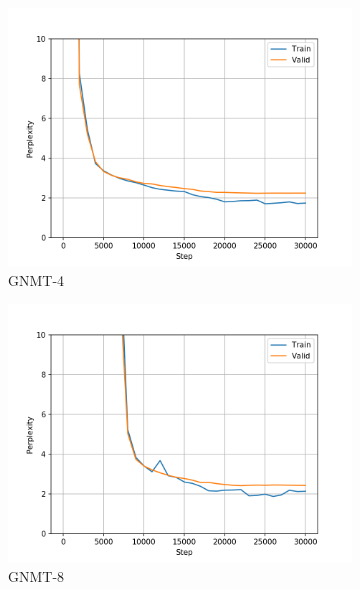 \begin{figure}[h]
\begin{subfigure}{0.3\textwidth}
\includegraphics[width=\textwidth]{../results/dbnqa1/run1/wmt16_gnmt_4_layer/ppls.png} 
\caption{GNMT-4}
\label{fig:dbnqa gnmt4 ppl}
\end{subfigure}
\hfill
\begin{subfigure}{0.3\textwidth}
\includegraphics[width=\textwidth]{../results/dbnqa1/run1/wmt16_gnmt_8_layer/ppls.png}
\caption{GNMT-8}
\label{fig:dbnqa gnmt8 ppl}
\end{subfigure}
\hfill
\begin{subfigure}{0.3\textwidth}

\end{subfigure}
\end{figure}
